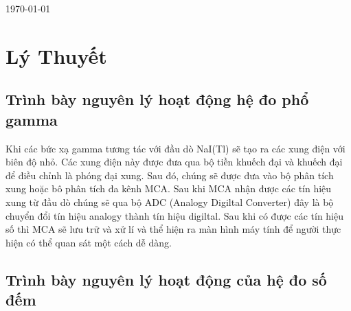 \documentclass[12pt]{article}
\begin{document}
\begin{titlepage}

\vspace{3cm}

{\large \today}\\[2cm] %


 

\vfill %

\end{titlepage}

\section{Lý Thuyết}

\subsection{Trình bày nguyên lý hoạt động hệ đo phổ gamma}

\indent Khi các bức xạ gamma tương tác với đầu dò NaI(Tl) sẽ tạo ra các xung điện với biên độ nhỏ. Các xung điện này được đưa qua bộ tiền khuếch đại và khuếch đại để điều chỉnh là phóng đại xung. Sau đó, chúng sẽ được đưa vào bộ phân tích xung hoặc bô phân tích đa kênh MCA. Sau khi MCA nhận được các tín hiệu xung từ đầu dò chúng sẽ qua bộ ADC (Analogy Digiltal Converter) đây là bộ chuyển đổi tín hiệu analogy thành tín hiệu digiltal. Sau khi có được các tín hiệu số thì MCA sẽ lưu trữ và xử lí và thể hiện ra màn hình máy tính để người thực hiện có thể quan sát một cách dễ dàng.

\subsection{Trình bày nguyên lý hoạt động của hệ đo số đếm}
\end{document}
